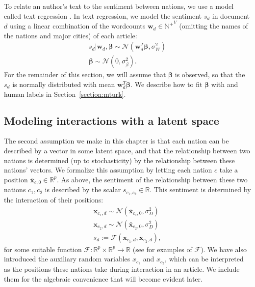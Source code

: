 To relate an author's text to the sentiment between nations, we use a
model called text regression \citep{kogan:2009}.  In text regression,
we model the sentiment $s_d$ in document $d$ using a linear
combination of the wordcounts $\bm w_d \in \mathbb{N^+}^V$ (omitting
the names of the nations and major cities) of each article:
\begin{align}
  s_d | \bm w_d, \bm \beta \sim \mathcal{N}( \bm w_d^T \bm \beta,
  \sigma_W^2 ) \nonumber \\
  \bm \beta \sim \mathcal{N}(0, \sigma_\beta^2 ).
  \label{eq:sentiment_text}
\end{align}
For the remainder of this section, we will assume that $\bm \beta$ is
observed, so that the $s_d$ is normally distributed with mean
$\bm w_d^T \bm \beta$.  We describe how to fit $\bm \beta$ with
 and human labels in
Section~\ref{section:mturk}.

\subsection{Modeling interactions with a latent space}
\label{sec:fr_latent_space_model}
The second assumption we make in this chapter is that each nation can
be described by a vector in some latent space, and that the
relationship between two nations is determined (up to stochasticity)
by the relationship between these nations' vectors.  We formalize this
assumption by letting each nation $c$ take a position $\bm \bar
x_{c,0} \in \mathbb{R}^p$. As above, the sentiment of the relationship
between these two nations $c_1, c_2$ is described by the scalar
$s_{c_1,c_2} \in \mathbb{R}$.  This sentiment is determined by the
interaction of their positions:
\begin{align}
  \bm x_{c_1,d} \sim \mathcal{N}(\bm \bar x_{c_1, 0}, \sigma_D^2) \nonumber \\
  \bm x_{c_2,d} \sim \mathcal{N}(\bm \bar x_{c_2, 0}, \sigma_D^2) \nonumber \\
  s_d := \mathcal{F}(\bm x_{c_1,d}, \bm x_{c_2,d}), \label{eq:sentiment_space}
\end{align}
for some suitable function $\mathcal{F}: \mathbb{R}^p \times
\mathbb{R}^p \rightarrow \mathbb{R}$ (see 
for examples of $\mathcal{F}$).  We have also introduced the auxiliary
random variables $x_{c_1}$ and $x_{c_2}$, which can be interpreted as
the positions these nations take during interaction in an article.  We
include them for the algebraic convenience that will become evident
later.

